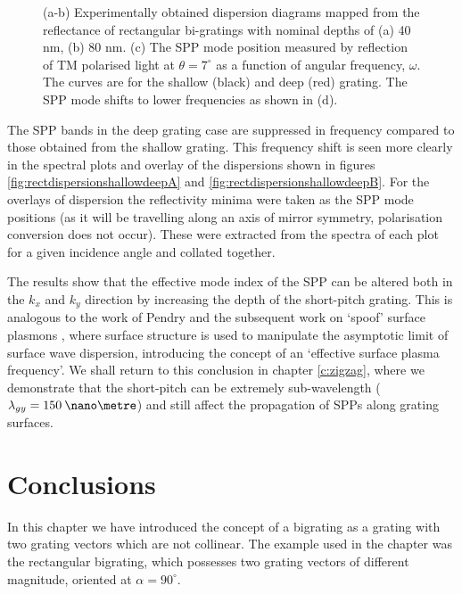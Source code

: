 \begin{figure}
\begin{center}
\end{center}
\caption[Experimentally obtained dispersion diagrams mapped from the reflectance of rectangular bi-gratings with nominal depths of $40\:\nano\metre$ and $80\:\nano\meter$]{(a-b) Experimentally obtained dispersion diagrams mapped from the reflectance of rectangular bi-gratings with nominal depths of (a) 40 nm, (b) 80 nm\label{fig:rectdispersionshallowdeep}. (c) The SPP mode position measured by reflection of TM polarised light at $\theta=7^\circ$ as a function of angular frequency, $\omega$. The curves are for the shallow (black) and deep (red) grating. The SPP mode shifts to lower frequencies as shown in (d).}
\end{figure}

The SPP bands in the deep grating case are suppressed in frequency compared to those obtained from the shallow grating. This frequency shift is seen more clearly in the spectral plots and overlay of the dispersions shown in figures \ref{fig:rectdispersionshallowdeepA} and \ref{fig:rectdispersionshallowdeepB}. For the overlays of dispersion the reflectivity minima were taken as the SPP mode positions (as it will be travelling along an axis of mirror symmetry, polarisation conversion does not occur). These were extracted from the spectra of each plot for a given incidence angle and collated together.


The results show that the effective mode index of the SPP can be altered both in the $k_x$ and $k_y$ direction by increasing the depth of the short-pitch grating. This is analogous to the work of Pendry \cite{Pendry2004} and the subsequent work on `spoof' surface plasmons \cite{Hibbins2005}, where surface structure is used to manipulate the asymptotic limit of surface wave dispersion, introducing the concept of an `effective surface plasma frequency'. We shall return to this conclusion in chapter \ref{c:zigzag}, where we demonstrate that the short-pitch can be extremely sub-wavelength ($\lambda_{gy}=150\:\nano\metre$) and still affect the propagation of SPPs along grating surfaces. 


\section{Conclusions}

In this chapter we have introduced the concept of a bigrating as a grating with two grating vectors which are not collinear. The example used in the chapter was the rectangular bigrating, which possesses two grating vectors of different magnitude, oriented at $\alpha=90^\circ$.

